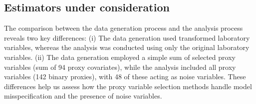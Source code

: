 \documentclass[sn-vancouver,Numbered,lineno,pdflatex]{sn-jnl}
\begin{document}
\subsection*{Estimators under
consideration}\label{estimators-under-consideration}

The comparison between the data generation process and the analysis
process reveals two key differences: (i) The data generation used
transformed laboratory variables, whereas the analysis was conducted
using only the original laboratory variables. (ii) The data generation
employed a simple sum of selected proxy variables (sum of 94 proxy
covariates), while the analysis included all proxy variables (142 binary
proxies), with 48 of these acting as noise variables. These differences
help us assess how the proxy variable selection methods handle model
misspecification and the presence of noise variables.
\end{document}
